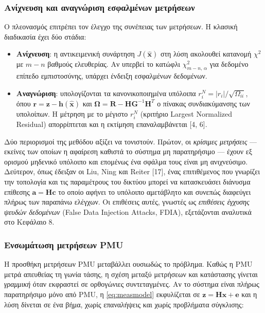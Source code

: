 \subsubsection*{Ανίχνευση και αναγνώριση εσφαλμένων μετρήσεων}

Ο πλεονασμός επιτρέπει τον έλεγχο της συνέπειας των μετρήσεων. Η κλασική διαδικασία έχει δύο στάδια:

\begin{itemize}
\item \textbf{Ανίχνευση}: η αντικειμενική συνάρτηση $J(\hat{\mathbf{x}})$ στη λύση ακολουθεί
      κατανομή $\chi^2$ με $m-n$ βαθμούς ελευθερίας. Αν υπερβεί το κατώφλι
      $\chi^2_{m-n,\,\alpha}$ για δεδομένο επίπεδο εμπιστοσύνης, υπάρχει ένδειξη εσφαλμένων δεδομένων.
\item \textbf{Αναγνώριση}: υπολογίζονται τα κανονικοποιημένα υπόλοιπα
      $r_i^{N} = |r_i| / \sqrt{\Omega_{ii}}$, όπου $\mathbf{r} = \mathbf{z}-\mathbf{h}(\hat{\mathbf{x}})$
      και $\boldsymbol{\Omega} = \mathbf{R} - \mathbf{H}\mathbf{G}^{-1}\mathbf{H}^{T}$ ο πίνακας
      συνδιακύμανσης των υπολοίπων. Η μέτρηση με το μέγιστο $r_i^{N}$ (κριτήριο Largest Normalized
      Residual) απορρίπτεται και η εκτίμηση επαναλαμβάνεται [4, 6].
\end{itemize}

Δύο περιορισμοί της μεθόδου αξίζει να τονιστούν. Πρώτον, οι \emph{κρίσιμες μετρήσεις} — εκείνες
των οποίων η αφαίρεση καθιστά το σύστημα μη παρατηρήσιμο — έχουν εξ ορισμού μηδενικό υπόλοιπο και
επομένως ένα σφάλμα τους είναι μη ανιχνεύσιμο. Δεύτερον, όπως έδειξαν οι Liu, Ning και Reiter [17],
ένας επιτιθέμενος που γνωρίζει την τοπολογία και τις παραμέτρους του δικτύου μπορεί να κατασκευάσει
διάνυσμα επίθεσης $\mathbf{a} = \mathbf{H}\mathbf{c}$ το οποίο αφήνει το υπόλοιπο αμετάβλητο και
συνεπώς διαφεύγει πλήρως των παραπάνω ελέγχων. Οι επιθέσεις αυτές, γνωστές ως \emph{επιθέσεις
έγχυσης ψευδών δεδομένων} (False Data Injection Attacks, FDIA), εξετάζονται αναλυτικά στο Κεφάλαιο 8.

\subsubsection*{Ενσωμάτωση μετρήσεων PMU}

Η προσθήκη μετρήσεων PMU μεταβάλλει ουσιωδώς το πρόβλημα. Καθώς η PMU μετρά απευθείας τη γωνία
τάσης, η σχέση μεταξύ μετρήσεων και κατάστασης γίνεται \emph{γραμμική} όταν εκφραστεί σε ορθογώνιες
συντεταγμένες. Αν το σύστημα είναι πλήρως παρατηρήσιμο μόνο από PMU, η \eqref{eq:measmodel}
εκφυλίζεται σε $\mathbf{z} = \mathbf{H}\mathbf{x} + \mathbf{e}$ και η λύση δίνεται σε ένα βήμα,
χωρίς επαναλήψεις και χωρίς προβλήματα σύγκλισης:

